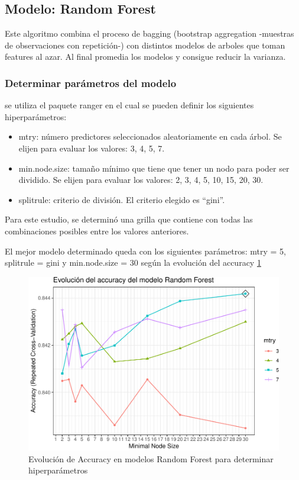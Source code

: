 \subsection{Modelo: Random Forest}

Este algoritmo combina el proceso de bagging (bootstrap aggregation
-muestras de observaciones con repetición-) con distintos modelos de
arboles que toman features al azar. Al final promedia los modelos y
consigue reducir la varianza.


\subsubsection{Determinar parámetros del modelo}

se utiliza el paquete ranger en el cual se pueden definir los siguientes
hiperparámetros:

\begin{itemize}
	\item
	mtry: número predictores seleccionados aleatoriamente en cada árbol.
	Se elijen para evaluar los valores: 3, 4, 5, 7.
	\item
	min.node.size: tamaño mínimo que tiene que tener un nodo para poder
	ser dividido. Se elijen para evaluar los valores: 2, 3, 4, 5, 10, 15,
	20, 30.
	\item
	splitrule: criterio de división. El criterio elegido es ``gini''.
\end{itemize}

Para este estudio, se determinó una grilla que contiene con todas las
combinaciones posibles entre los valores anteriores.

El mejor modelo determinado queda con los siguientes parámetros: mtry =
5, splitrule = gini y min.node.size = 30 según la evolución del accuracy \ref{fig:rf_hiperparam}


\begin{figure}[!htb]
	\centering
	\includegraphics{imagenes/modelos_varios/unnamed-chunk-24-1.pdf}
	\caption{Evolución de Accuracy en modelos Random Forest para determinar hiperparámetros}
	\label{fig:rf_hiperparam}
\end{figure}



